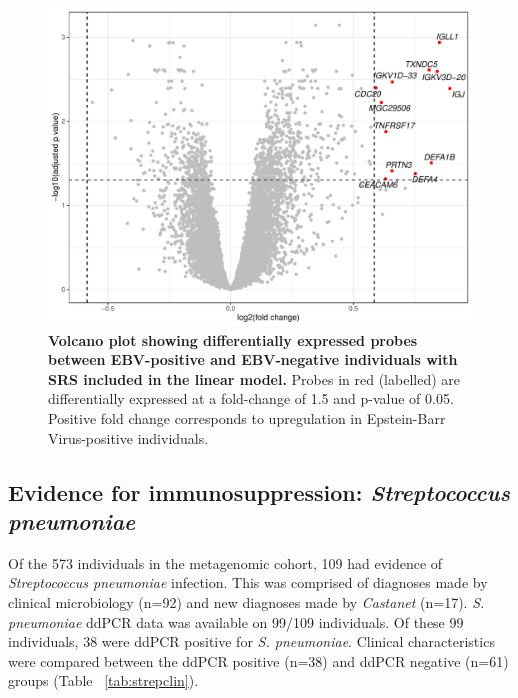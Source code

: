 \begin{figure}[htbp]
\centering
\includegraphics[width=\textwidth]{./Results3/Images/ebvsig2.pdf}
\caption[EBV signature with SRS as covariate]{\textbf{Volcano plot showing differentially expressed probes between EBV-positive and EBV-negative individuals with SRS included in the linear model.} Probes in red (labelled) are differentially expressed at a fold-change of 1.5 and p-value of 0.05. Positive fold change corresponds to upregulation in Epstein-Barr Virus-positive individuals.}
\label{fig:ebvsig2}


\end{figure}
\FloatBarrier

\subsection{Evidence for immunosuppression: \textit{Streptococcus pneumoniae}}

Of the 573 individuals in the metagenomic cohort, 109 had evidence of \textit{Streptococcus pneumoniae} infection. This was comprised of diagnoses made by clinical microbiology (n=92) and new diagnoses made by \textit{Castanet} (n=17). \textit{S. pneumoniae} ddPCR data was available on 99/109 individuals. Of these 99 individuals, 38 were ddPCR positive for \textit{S. pneumoniae}. Clinical characteristics were compared between the ddPCR positive (n=38) and ddPCR negative (n=61) groups (Table ~\ref{tab:strepclin}). 

